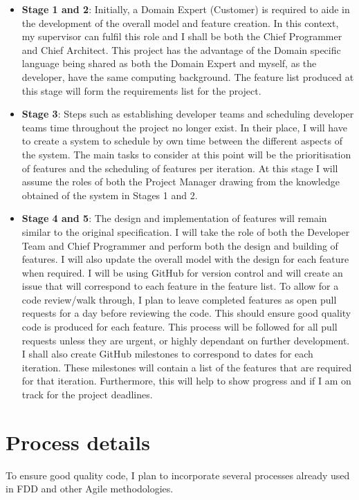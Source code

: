 \documentclass{article}
\begin{document}
\begin{itemize}
	\item \textbf{Stage 1 and 2}: Initially, a Domain Expert (Customer) is required to aide in the development of the overall model and feature creation. In this context, my supervisor can fulfil this role and I shall be both the Chief Programmer and Chief Architect. This project has the advantage of the Domain specific language being shared as both the Domain Expert and myself, as the developer, have the same computing background. The feature list produced at this stage will form the requirements list for the project.

\newpage

	\item \textbf{Stage 3}: Steps such as establishing developer teams and scheduling developer teams time throughout the project no longer exist. In their place, I will have to create a system to schedule by own time between the different aspects of the system. The main tasks to consider at this point will be the prioritisation of features and the scheduling of features per iteration. At this stage I will assume the roles of both the Project Manager drawing from the knowledge obtained of the system in Stages 1 and 2.

	\item \textbf{Stage 4 and 5}: The design and implementation of features will remain similar to the original specification. I will take the role of both the Developer Team and Chief Programmer and perform both the design and building of features. I will also update the overall model with the design for each feature when required. I will be using GitHub for version control and will create an issue that will correspond to each feature in the feature list. To allow for a code review/walk through, I plan to leave completed features as open pull requests for a day before reviewing the code. This should ensure good quality code is produced for each feature. This process will be followed for all pull requests unless they are urgent, or highly dependant on further development. I shall also create GitHub milestones to correspond to dates for each iteration. These milestones will contain a list of the features that are required for that iteration. Furthermore, this will help to show progress and if I am on track for the project deadlines.

\end{itemize}

\newpage

\section{Process details}
To ensure good quality code, I plan to incorporate several processes already used in FDD and other Agile methodologies.
\end{document}
